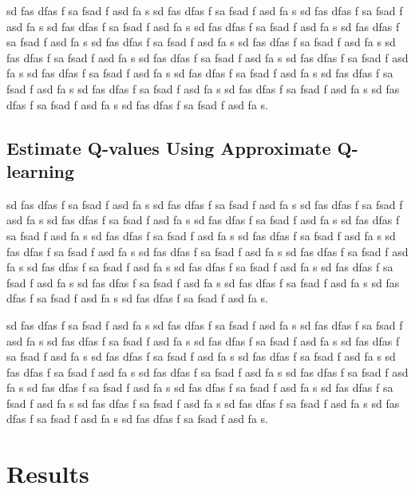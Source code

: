 \documentclass{article}
\begin{document}
sd fas dfas f sa fsad f asd fa s sd fas dfas f sa fsad f asd fa s sd fas dfas f sa fsad f asd fa s
sd fas dfas f sa fsad f asd fa s sd fas dfas f sa fsad f asd fa s sd fas dfas f sa fsad f asd fa s
sd fas dfas f sa fsad f asd fa s sd fas dfas f sa fsad f asd fa s sd fas dfas f sa fsad f asd fa s
sd fas dfas f sa fsad f asd fa s sd fas dfas f sa fsad f asd fa s sd fas dfas f sa fsad f asd fa s
sd fas dfas f sa fsad f asd fa s sd fas dfas f sa fsad f asd fa s sd fas dfas f sa fsad f asd fa s
sd fas dfas f sa fsad f asd fa s sd fas dfas f sa fsad f asd fa s sd fas dfas f sa fsad f asd fa s.

\subsection{Estimate Q-values Using Approximate Q-learning}

sd fas dfas f sa fsad f asd fa s sd fas dfas f sa fsad f asd fa s sd fas dfas f sa fsad f asd fa s
sd fas dfas f sa fsad f asd fa s sd fas dfas f sa fsad f asd fa s sd fas dfas f sa fsad f asd fa s
sd fas dfas f sa fsad f asd fa s sd fas dfas f sa fsad f asd fa s sd fas dfas f sa fsad f asd fa s
sd fas dfas f sa fsad f asd fa s sd fas dfas f sa fsad f asd fa s sd fas dfas f sa fsad f asd fa s
sd fas dfas f sa fsad f asd fa s sd fas dfas f sa fsad f asd fa s sd fas dfas f sa fsad f asd fa s
sd fas dfas f sa fsad f asd fa s sd fas dfas f sa fsad f asd fa s sd fas dfas f sa fsad f asd fa s.

sd fas dfas f sa fsad f asd fa s sd fas dfas f sa fsad f asd fa s sd fas dfas f sa fsad f asd fa s
sd fas dfas f sa fsad f asd fa s sd fas dfas f sa fsad f asd fa s sd fas dfas f sa fsad f asd fa s
sd fas dfas f sa fsad f asd fa s sd fas dfas f sa fsad f asd fa s sd fas dfas f sa fsad f asd fa s
sd fas dfas f sa fsad f asd fa s sd fas dfas f sa fsad f asd fa s sd fas dfas f sa fsad f asd fa s
sd fas dfas f sa fsad f asd fa s sd fas dfas f sa fsad f asd fa s sd fas dfas f sa fsad f asd fa s
sd fas dfas f sa fsad f asd fa s sd fas dfas f sa fsad f asd fa s sd fas dfas f sa fsad f asd fa s.

\pagebreak[4]

\section{Results}
\end{document}
